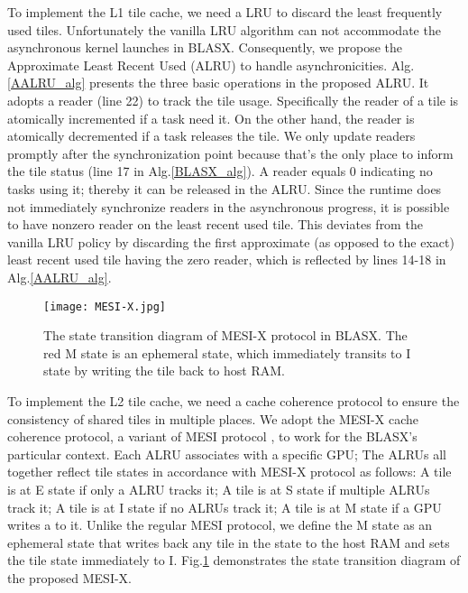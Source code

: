 \documentclass[conference]{IEEEtran}
\begin{document}
To implement the L1 tile cache, we need a LRU to discard the least frequently used tiles.
Unfortunately the vanilla LRU algorithm \cite{LRU} can not accommodate the asynchronous kernel 
launches in BLASX. Consequently, we propose the Approximate Least Recent Used (ALRU) to handle asynchronicities.
Alg.\ref{AALRU_alg} presents the three basic operations in the proposed ALRU.
It adopts a reader (line 22) to track the tile usage. Specifically 
the reader of a tile is atomically incremented if a task need it. On the other hand, the 
reader is atomically decremented if a task releases the tile. We only update readers promptly 
after the synchronization point because that's the only place to inform the tile status 
(line 17 in Alg.\ref{BLASX_alg}). A reader equals 0 indicating no tasks using it; thereby 
it can be released in the ALRU. Since the runtime does not immediately synchronize readers 
in the asynchronous progress, it is possible to have nonzero reader on the least recent used 
tile. This deviates from the vanilla LRU policy by discarding the first approximate (as opposed to the exact)
least recent used tile having the zero reader, which is reflected by lines 14-18 in Alg.\ref{AALRU_alg}.
\begin{figure}[!t]
\vspace{-0.1in}
\centering
\texttt{[image: MESI-X.jpg]}
\caption{The state transition diagram of MESI-X protocol in BLASX. The red M state is an ephemeral state, 
which immediately transits to I state by writing the tile back to host RAM.}
\label{MESI-X}
\vspace{-0.25in}
\end{figure}

To implement the L2 tile cache, we need a cache coherence protocol to ensure the consistency of shared tiles in 
multiple places. We adopt the MESI-X cache coherence protocol, a variant of MESI protocol \cite{MOESI}, to work for the BLASX's particular
context. Each ALRU associates with a specific GPU; The ALRUs all together reflect tile states in accordance with 
MESI-X protocol as follows: A tile is at E state if only a ALRU tracks it; A tile is at S state if multiple ALRUs 
track it; A tile is at I state if no ALRUs track it; A tile is at M state if a GPU writes a  to it. Unlike the
regular MESI protocol, we define the M state as an ephemeral state that writes back any tile in the state to the host RAM 
and sets the tile state immediately to I. Fig.\ref{MESI-X} demonstrates the state transition diagram of the proposed MESI-X.
\end{document}
